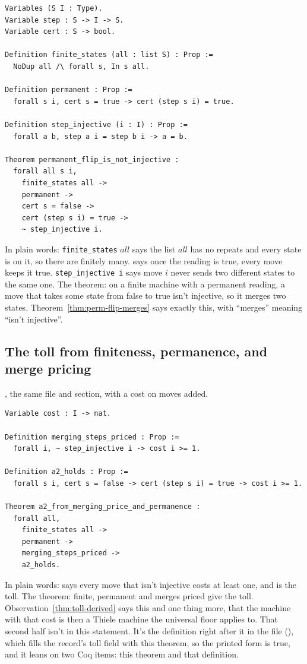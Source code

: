 {\footnotesize
\begin{verbatim}
Variables (S I : Type).
Variable step : S -> I -> S.
Variable cert : S -> bool.

Definition finite_states (all : list S) : Prop :=
  NoDup all /\ forall s, In s all.

Definition permanent : Prop :=
  forall s i, cert s = true -> cert (step s i) = true.

Definition step_injective (i : I) : Prop :=
  forall a b, step a i = step b i -> a = b.

Theorem permanent_flip_is_not_injective :
  forall all s i,
    finite_states all ->
    permanent ->
    cert s = false ->
    cert (step s i) = true ->
    ~ step_injective i.
\end{verbatim}}

In plain words: \texttt{finite\_states} $\mathit{all}$ says the list $\mathit{all}$ has no repeats and every
state is on it, so there are finitely many.  says once the reading is true,
every move keeps it true. \texttt{step\_injective i} says move $i$ never sends two different
states to the same one. The theorem: on a finite machine with a permanent reading, a move that
takes some state from false to true isn't injective, so it merges two states.
Theorem~\ref{thm:perm-flip-merges} says exactly this, with ``merges'' meaning ``isn't
injective''.

\subsection{The toll from finiteness, permanence, and merge pricing}

{\raggedright {}, the same file and section, with a cost on moves added.\par}

{\footnotesize
\begin{verbatim}
Variable cost : I -> nat.

Definition merging_steps_priced : Prop :=
  forall i, ~ step_injective i -> cost i >= 1.

Definition a2_holds : Prop :=
  forall s i, cert s = false -> cert (step s i) = true -> cost i >= 1.

Theorem a2_from_merging_price_and_permanence :
  forall all,
    finite_states all ->
    permanent ->
    merging_steps_priced ->
    a2_holds.
\end{verbatim}}

In plain words:  says every move that isn't injective costs at
least one, and  is the toll. The theorem: finite, permanent and merges priced
give the toll. Observation~\ref{thm:toll-derived} says this and one thing more, that the machine
with that cost is then a Thiele machine the universal floor applies to. That second half
isn't in this statement. It's the definition right after it in the file
(), which fills the record's toll field with
this theorem, so the printed form is true, and it leans on two Coq items: this theorem and that
definition.

